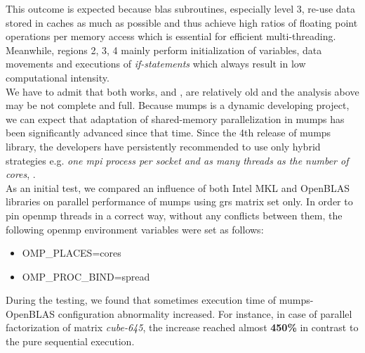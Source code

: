 This outcome is expected because \acrshort{blas} subroutines, especially level 3, re-use data stored in caches as much as possible and thus achieve high ratios of floating point operations per memory access which is essential for efficient multi-threading. Meanwhile, regions 2, 3, 4 mainly perform initialization of variables, data movements and executions of \textit{if-statements} which always result in low computational intensity.\\



We have to admit that both works, \cite{chowdhury2010some} and \cite{l2013introduction}, are relatively old and the analysis above may be not complete and full. Because \acrshort{mumps} is a dynamic developing project, we can expect that adaptation of shared-memory parallelization in \acrshort{mumps} has been significantly advanced since that time. Since the 4th release of \acrshort{mumps} library, the developers have persistently recommended to use only hybrid strategies e.g. \textit{one \acrshort{mpi} process per socket and as many threads as the number of cores}, \cite{mumps-manual}.\\


As an initial test, we compared an influence of both Intel MKL and OpenBLAS libraries on parallel performance of \acrshort{mumps} using \acrshort{grs} matrix set only. In order to pin \acrshort{openmp} threads in a correct way, without any conflicts between them, the following \acrshort{openmp} environment variables were set as follows:

\begin{itemize}
	\item OMP\_PLACES=cores
	\item OMP\_PROC\_BIND=spread
\end{itemize} 


During the testing, we found that sometimes execution time of \acrshort{mumps}-OpenBLAS configuration abnormality increased. For instance, in case of parallel factorization of matrix \textit{cube-645}, the increase reached almost \textbf{450\%} in contrast to the pure sequential execution. \\

